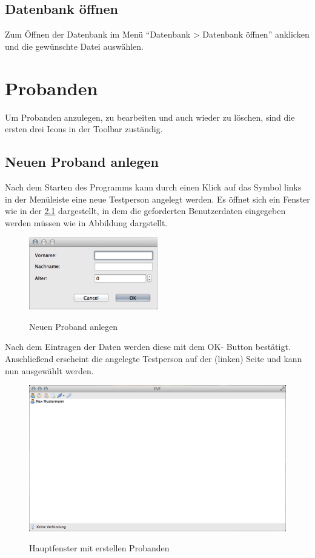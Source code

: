 \documentclass[11pt,accentcolor=tud2a,colorback,noheadingspace,bigchapter]{tudreport}
\begin{document}
\section{Datenbank öffnen}
\label{database:datenbank-offnen}
Zum Öffnen der Datenbank im Menü ``Datenbank \textgreater{} Datenbank öffnen'' 
anklicken und die gewünschte Datei auswählen.


\chapter{Probanden}
\label{probands:probanden}
\label{probands::doc}

Um Probanden anzulegen, zu bearbeiten und auch wieder zu löschen, sind die 
ersten drei Icons in der Toolbar zuständig.

\section{Neuen Proband anlegen}
\label{probands:neuen-proband-anlegen}
Nach dem Starten des Programms kann durch einen Klick auf das Symbol links 
in der Menüleiste eine neue Testperson angelegt werden.
Es öffnet sich ein Fenster wie in der \ref{fig:proband-create} dargestellt, in 
dem die geforderten Benutzerdaten eingegeben werden müssen wie in Abbildung 
dargstellt.

\begin{figure}[H]
	\centering
	\includegraphics[width=0.5\textwidth]{person_dialog.png}
	\label{fig:proband-create}
	\caption{Neuen Proband anlegen}
\end{figure}

Nach dem Eintragen der Daten werden diese mit dem OK- Button bestätigt. 
Anschließend erscheint die angelegte Testperson auf der (linken) Seite und 
kann nun ausgewählt werden.

\begin{figure}[H]
	\includegraphics[width=\textwidth]{person_created.png}
	\label{fig:proband-created}
	\caption{Hauptfenster mit erstellen Probanden}
\end{figure}
\end{document}
